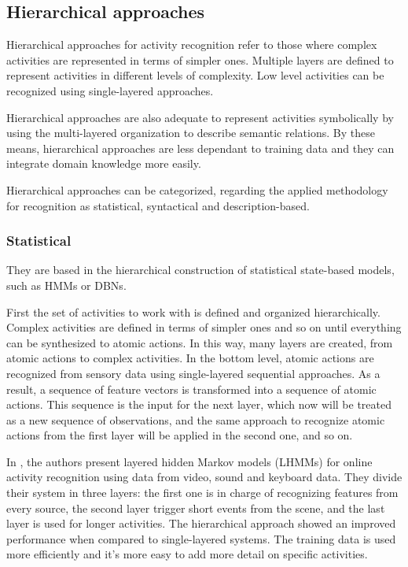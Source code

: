 \subsection{Hierarchical approaches}
Hierarchical approaches for activity recognition refer to those where complex activities are represented in terms of simpler ones. 
Multiple layers are defined to represent activities in different levels of complexity.
Low level activities can be recognized using single-layered approaches. 

Hierarchical approaches are also adequate to represent activities symbolically by using the multi-layered organization to describe semantic relations.
By these means, hierarchical approaches are less dependant to training data and they can integrate domain knowledge more easily.

Hierarchical approaches can be categorized, regarding the applied methodology for recognition as statistical, syntactical and description-based. %


\subsubsection{Statistical}
They are based in the hierarchical construction of statistical state-based models, such as HMMs or DBNs.

First the set of activities to work with is defined and organized hierarchically.
Complex activities are defined in terms of simpler ones and so on until everything can be synthesized to atomic actions.
In this way, many layers are created, from atomic actions to complex activities.
In the bottom level, atomic actions are recognized from sensory data using single-layered sequential approaches. 
As a result, a sequence of feature vectors is transformed into a sequence of atomic actions.
This sequence is the input for the next layer, which now will be treated as a new sequence of observations, and the same approach to recognize atomic actions from the first layer will be applied in the second one, and so on.

In \citep{Oliver2002_LayRepHumActRec}, the authors present layered hidden Markov models (LHMMs) for online activity recognition using data from video, sound and keyboard data. 
They divide their system in three layers: the first one is in charge of recognizing features from every source, the second layer trigger short events from the scene, and the last layer is used for longer activities. 
The hierarchical approach showed an improved performance when compared to single-layered systems.
The training data is used more efficiently and it's more easy to add more detail on specific activities.

